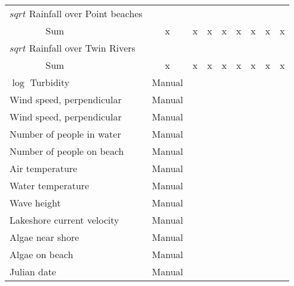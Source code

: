 \documentclass[12pt]{article}
\begin{document}
\begin{table}
{\begin{minipage}{\textwidth}
\begin{tabular}{ll|cccccccc}
        \hline
        \multicolumn{2}{l|}{$sqrt$ Rainfall over Point beaches} &&&&&&&& \\
        & Sum & x & x & x & x & x & x & x & x \\
        \hline
        \multicolumn{2}{l|}{$sqrt$ Rainfall over Twin Rivers} &&&&&&&& \\
        & Sum & x & x & x & x & x & x & x & x \\
        \hline
        \multicolumn{2}{l|}{$\log$ Turbidity} & Manual&&&&&&& \\
        \hline
        \multicolumn{2}{l|}{Wind speed, perpendicular} & Manual&&&&&&& \\
        \hline
        \multicolumn{2}{l|}{Wind speed, perpendicular} & Manual&&&&&&& \\
        \hline
        \multicolumn{2}{l|}{Number of people in water} & Manual&&&&&&& \\
        \hline
        \multicolumn{2}{l|}{Number of people on beach} & Manual&&&&&&& \\
        \hline
        \multicolumn{2}{l|}{Air temperature} & Manual&&&&&&& \\
        \hline
        \multicolumn{2}{l|}{Water temperature} & Manual&&&&&&& \\
        \hline
        \multicolumn{2}{l|}{Wave height} & Manual&&&&&&& \\
        \hline
        \multicolumn{2}{l|}{Lakeshore current velocity} & Manual&&&&&&& \\
        \hline
        \multicolumn{2}{l|}{Algae near shore} & Manual&&&&&&& \\
        \hline
        \multicolumn{2}{l|}{Algae on beach} & Manual&&&&&&& \\
        \hline
        \multicolumn{2}{l|}{Julian date} & Manual&&&&&&& \\
        \hline
        \end{tabular}
        \end{minipage}}
\end{table}
\end{document}
